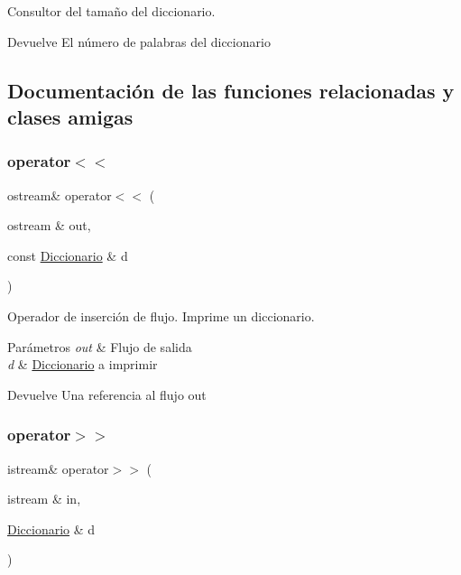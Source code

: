 Consultor del tamaño del diccionario. 

\begin{DoxyReturn}{Devuelve}
El número de palabras del diccionario 
\end{DoxyReturn}


\subsection{Documentación de las funciones relacionadas y clases amigas}
\mbox{\label{classDiccionario_aeb8c0d19c5f4c9d9680ab42b51dbb38e}} 
\subsubsection{\texorpdfstring{operator$<$$<$}{operator<<}}
{\footnotesize\ttfamily ostream\& operator$<$$<$ (\begin{DoxyParamCaption}\item[{ostream \&}]{out,  }\item[{const \hyperlink{classDiccionario}{Diccionario} \&}]{d }\end{DoxyParamCaption})\hspace{0.3cm}{\ttfamily [friend]}}



Operador de inserción de flujo. Imprime un diccionario. 


\begin{DoxyParams}{Parámetros}
{\em out} & Flujo de salida \\
\hline
{\em d} & \hyperlink{classDiccionario}{Diccionario} a imprimir \\
\hline
\end{DoxyParams}
\begin{DoxyReturn}{Devuelve}
Una referencia al flujo out 
\end{DoxyReturn}
\mbox{\label{classDiccionario_acf72932a86e98d33aef771dde204a44d}} 
\subsubsection{\texorpdfstring{operator$>$$>$}{operator>>}}
{\footnotesize\ttfamily istream\& operator$>$$>$ (\begin{DoxyParamCaption}\item[{istream \&}]{in,  }\item[{\hyperlink{classDiccionario}{Diccionario} \&}]{d }\end{DoxyParamCaption})\hspace{0.3cm}{\ttfamily [friend]}}



